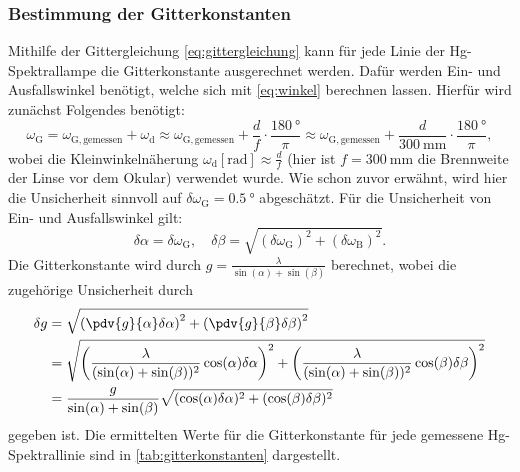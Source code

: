 \subsubsection{Bestimmung der Gitterkonstanten}\label{subsubsec:gitterkonstante}
Mithilfe der Gittergleichung \ref{eq:gittergleichung} kann für jede Linie der Hg-Spektrallampe die Gitterkonstante ausgerechnet werden. Dafür werden Ein- und Ausfallswinkel
benötigt, welche sich mit \ref{eq:winkel} berechnen lassen. Hierfür wird zunächst Folgendes benötigt:
\begin{equation*}
    \omega_{\mathrm{G}} = \omega_{\mathrm{G,gemessen}} + \omega_{\mathrm{d}} \approx \omega_{\mathrm{G,gemessen}} + \frac{d}{f} \cdot \frac{\SI{180}{\degree}}{\pi} \approx \omega_{\mathrm{G,gemessen}} + \frac{d}{\SI{300}{\milli \meter}} \cdot \frac{\SI{180}{\degree}}{\pi} ,
\end{equation*} wobei die Kleinwinkelnäherung $\omega_{\mathrm{d}} [\unit{\radian}] \approx \frac{d}{f}$ (hier ist $f = \SI{300}{\milli \meter}$ die Brennweite der Linse vor dem Okular) verwendet wurde.
Wie schon zuvor erwähnt, wird hier die Unsicherheit sinnvoll auf $\delta \omega_{\mathrm{G}} = \SI{0,5}{\degree}$ abgeschätzt. Für die Unsicherheit von Ein- und Ausfallswinkel gilt:
\begin{equation*}
    \delta \alpha = \delta \omega_{\mathrm{G}} , \quad \delta \beta = \sqrt{(\delta \omega_{\mathrm{G}})^2 + (\delta \omega_{\mathrm{B}})^2} .
\end{equation*} Die Gitterkonstante wird durch $g = \frac{\lambda}{\sin(\alpha) + \sin(\beta)}$ berechnet, wobei die zugehörige Unsicherheit durch
\begin{align*}
    \delta g &= \sqrt{\left(\pdv{g}{\alpha} \delta \alpha\right)^2 + \left(\pdv{g}{\beta} \delta \beta\right)^2} \\
    &= \sqrt{\left(\frac{\lambda}{(\sin(\alpha) + \sin(\beta))^2} \cos(\alpha) \delta \alpha\right)^2 + \left(\frac{\lambda}{(\sin(\alpha) + \sin(\beta))^2} \cos(\beta) \delta \beta\right)^2} \\
    &= \frac{g}{\sin(\alpha) + \sin(\beta)} \sqrt{(\cos(\alpha) \delta \alpha)^2 + (\cos(\beta) \delta \beta)^2}
\end{align*} gegeben ist. Die ermittelten Werte für die Gitterkonstante für jede gemessene Hg-Spektrallinie sind in \cref{tab:gitterkonstanten} dargestellt.
